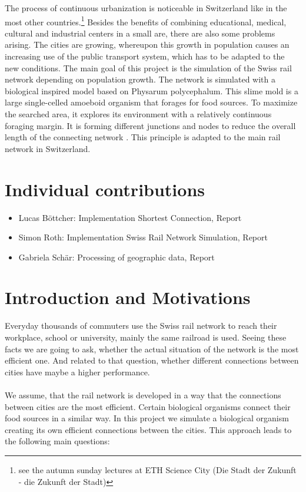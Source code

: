 \documentclass[11pt]{scrartcl}
\begin{document}
The process of continuous urbanization is noticeable in Switzerland like in the most other countries.\footnote[1]{see the autumn sunday lectures at ETH Science City (Die Stadt der Zukunft - die Zukunft der Stadt)} Besides the benefits of combining educational, medical, cultural and industrial centers in a small are, there are also some problems arising. The cities are growing, whereupon this growth in population causes an increasing use of the public transport system, which has to be adapted to the new conditions. The main goal of this project is the simulation of the Swiss rail network depending on population growth. The network is simulated with a biological inspired model based on Physarum polycephalum. This slime mold is a large single-celled amoeboid organism that forages for food sources. To maximize the searched area, it explores its environment with a relatively continuous foraging margin. It is forming different junctions and nodes to reduce the overall length of the connecting network \cite{network_tokyo}. This principle is adapted to the main rail network in Switzerland. 


\section{Individual contributions}
\begin{itemize}
  \item Lucas Böttcher: Implementation Shortest Connection, Report
  \item Simon Roth: Implementation Swiss Rail Network Simulation, Report
  \item Gabriela Schär: Processing of geographic data, Report
\end{itemize}


\section{Introduction and Motivations}
\label{sec:introduction}
Everyday thousands of commuters use the Swiss rail network to reach their workplace, school or university, mainly the same railroad is used. Seeing these facts we are going to ask, whether the actual situation of the network is the most efficient one. And related to that question, whether different connections between cities have maybe a higher performance.\\
\\
We assume, that the rail network is developed in a way that the connections between cities are the most efficient. Certain biological organisms connect their food sources in a similar way. In this project we simulate a biological organism creating its own efficient connections between the cities. This approach leads to the following main questions:
\end{document}
